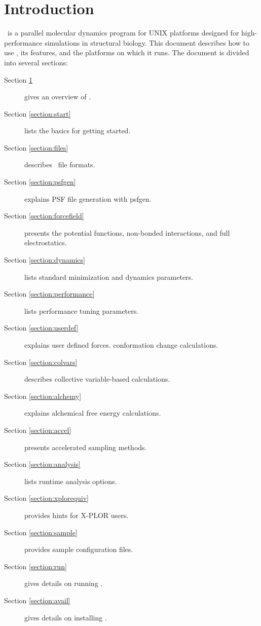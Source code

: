 

\section{Introduction}
\label{section:intro}

\NAMD\ is a parallel molecular dynamics program for UNIX 
platforms designed for high-performance 
simulations in structural biology.  This document describes how to use 
\NAMD, its features, and the platforms on which it runs.
The document is divided into several sections:
\begin{description}
\item[Section \ref{section:intro}] gives an overview of \NAMD.
\item[Section \ref{section:start}] lists the basics for getting started.
\item[Section \ref{section:files}] describes \NAMD\ file formats.
\item[Section \ref{section:psfgen}] explains PSF file generation with psfgen.
\item[Section \ref{section:forcefield}] presents the potential functions,
non-bonded interactions, and full electrostatics.
\item[Section \ref{section:dynamics}] lists standard minimization
and dynamics parameters.
\item[Section \ref{section:performance}] lists performance tuning parameters.
\item[Section \ref{section:userdef}] explains user defined forces.
conformation change calculations.
\item[Section \ref{section:colvars}] describes collective
variable-based calculations.
\item[Section \ref{section:alchemy}] explains alchemical free energy calculations.
\item[Section \ref{section:accel}] presents accelerated sampling methods.
\item[Section \ref{section:analysis}] lists runtime analysis options.
\item[Section \ref{section:xplorequiv}] provides hints for X-PLOR users.
\item[Section \ref{section:sample}] provides sample configuration files.
\item[Section \ref{section:run}] gives details on running \NAMD.
\item[Section \ref{section:avail}] gives details on installing \NAMD.
\end{description}

